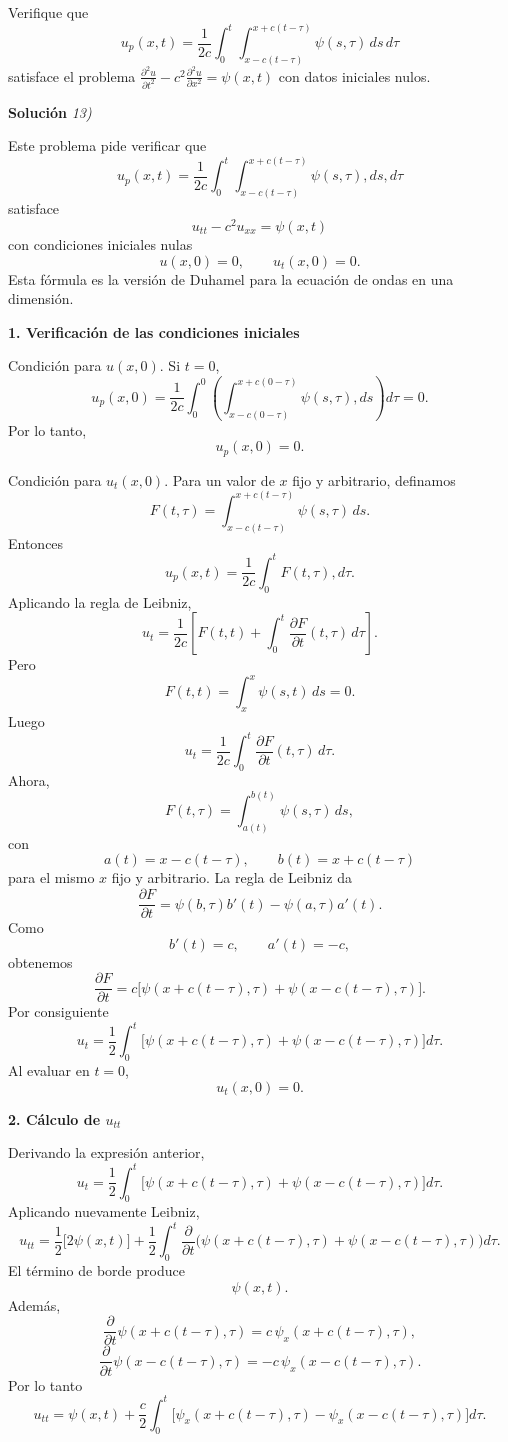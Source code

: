 \documentclass[11pt,spanish]{article}
\newcounter{problema}
\newcommand{\prob}{\stepcounter{problema} \vspace{.5cm} \noindent{\bf Problema \arabic{problema}: }}
\begin{document}
\prob Verifique que
\[
u_p(x,t) = \frac{1}{2c}\int_0^t \int_{x-c(t-\tau)}^{x+c(t-\tau)} \psi(s,\tau)\,ds\,d\tau
\]
satisface el problema \(\frac{\partial^2 u}{\partial t^2} - c^2\frac{\partial^2 u}{\partial x^2} = \psi(x,t)\) con datos iniciales nulos.

\vspace{0.5cm}
{\bf Soluci\'on }{\em 13)}
\vspace{0.5cm}

Este problema pide verificar que
$$
u_p(x,t)=\frac{1}{2c}\int_0^t
\int_{x-c(t-\tau)}^{x+c(t-\tau)}
\psi(s,\tau),ds,d\tau
$$
satisface
$$
u_{tt}-c^2u_{xx}=\psi(x,t)
$$
con condiciones iniciales nulas
$$
u(x,0)=0,\qquad u_t(x,0)=0.
$$
Esta fórmula es la versión de Duhamel para la ecuación de ondas en una dimensión.

{\bf 1. Verificación de las condiciones iniciales}

Condición para $u(x,0)$.
Si $t=0$,
$$
u_p(x,0)
=
\frac1{2c}
\int_0^0
\left(
\int_{x-c(0-\tau)}^{x+c(0-\tau)}
\psi(s,\tau),ds
\right)
d\tau
=0.
$$
Por lo tanto,
$$
u_p(x,0)=0.
$$

Condición para $u_t(x,0)$.
Para un valor de $x$ fijo y arbitrario, definamos
$$
F(t,\tau)
=
\int_{x-c(t-\tau)}^{x+c(t-\tau)}
\psi(s,\tau)\,ds .
$$
Entonces
$$
u_p(x,t)
=
\frac1{2c}
\int_0^t F(t,\tau),d\tau.
$$
Aplicando la regla de Leibniz,
$$
u_t=
\frac1{2c}
\left[
F(t,t)
+
\int_0^t
\frac{\partial F}{\partial t}(t,\tau)\,d\tau
\right].
$$
Pero
$$
F(t,t)
=
\int_x^x \psi(s,t)\,ds
=
0.
$$
Luego
$$
u_t=
\frac1{2c}
\int_0^t
\frac{\partial F}{\partial t}(t,\tau)\,d\tau.
$$
Ahora,
$$
F(t,\tau)
=
\int_{a(t)}^{b(t)}
\psi(s,\tau)\,ds,
$$
con
$$
a(t)=x-c(t-\tau),
\qquad
b(t)=x+c(t-\tau)
$$
para el mismo $x$ fijo y arbitrario.
La regla de Leibniz da
$$
\frac{\partial F}{\partial t}
=
\psi(b,\tau)b'(t)
-
\psi(a,\tau)a'(t).
$$
Como
$$
b'(t)=c,
\qquad
a'(t)=-c,
$$
obtenemos
$$
\frac{\partial F}{\partial t}
=
c\Big[
\psi(x+c(t-\tau),\tau)
+
\psi(x-c(t-\tau),\tau)
\Big].
$$
Por consiguiente
$$
u_t
=
\frac12
\int_0^t
\Big[
\psi(x+c(t-\tau),\tau)
+
\psi(x-c(t-\tau),\tau)
\Big]d\tau .
$$
Al evaluar en $t=0$,
$$
u_t(x,0)=0.
$$

{\bf 2. Cálculo de $u_{tt}$}

Derivando la expresión anterior,
$$
u_t
=
\frac12
\int_0^t
\Big[
\psi(x+c(t-\tau),\tau)
+
\psi(x-c(t-\tau),\tau)
\Big]d\tau .
$$
Aplicando nuevamente Leibniz,
$$
u_{tt}
=
\frac12
\Big[
2\psi(x,t)
\Big]
+
\frac12
\int_0^t
\frac{\partial}{\partial t}
\Big(
\psi(x+c(t-\tau),\tau)
+
\psi(x-c(t-\tau),\tau)
\Big)
d\tau .
$$
El término de borde produce
$$
\psi(x,t).
$$
Además,
$$
\frac{\partial}{\partial t}
\psi(x+c(t-\tau),\tau)
=
c\,\psi_x(x+c(t-\tau),\tau),
$$
$$
\frac{\partial}{\partial t}
\psi(x-c(t-\tau),\tau)
=
-c\,\psi_x(x-c(t-\tau),\tau).
$$
Por lo tanto
$$
u_{tt}
=
\psi(x,t)
+
\frac{c}{2}
\int_0^t
\Big[
\psi_x(x+c(t-\tau),\tau)
-
\psi_x(x-c(t-\tau),\tau)
\Big]
d\tau .
$$
\end{document}
